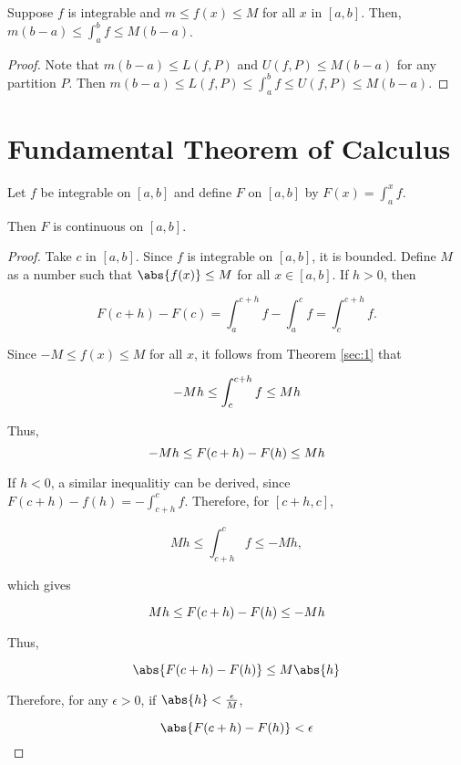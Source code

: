 \documentclass[11pt]{scrartcl}
\begin{document}
\begin{theorem}
  \label{sec:1}
  Suppose $f$ is integrable and $m\leq f(x) \leq M$ for all $x$ in $[a, b]$.
  Then, $m(b-a)\leq \int_a^b f \leq M(b-a)$.
\end{theorem}

\begin{proof}
  Note that $m(b-a) \leq L(f, P)$ and $U(f, P) \leq M(b-a)$ for any
  partition $P$. Then
  $m(b-a) \leq L(f, P) \leq \int_a^b f \leq U(f, P) \leq M(b-a)$.
\end{proof}
\section{Fundamental Theorem of Calculus}
\begin{theorem}
  Let $f$ be integrable on $[a, b]$ and define $F$ on $[a, b]$ by
  $F(x) = \int_a^xf $.

  Then $F$ is continuous on $[a, b]$.
\end{theorem}

\begin{proof}
  Take $c$ in $[a, b]$. Since $f$ is integrable on $[a, b]$, it is
  bounded. Define $M$ as a number such that $\abs{f(x)} \leq M$ for
  all $x\in[a, b]$. If $h > 0$, then

  \begin{equation*}
    F(c+h) - F(c) = \int_{a}^{c+h}f - \int_{a}^{c}f = \int_{c}^{c+h} f.
  \end{equation*}

  Since $-M \leq f(x) \leq M $ for all $x$, it follows from Theorem \ref{sec:1} that

  \begin{equation*}
    -M\* h \leq \int_c^{c+h} f \leq M\*h
  \end{equation*}

  Thus,
  \begin{equation*}
    -M\* h \leq F(c+h) - F(h) \leq M\*h
  \end{equation*}

  If $h < 0$, a similar inequalitiy can be derived, since
  $F(c+h) - f(h) = - \int^c_{c+h}f$. Therefore, for $[c+h, c]$,

  \begin{equation*}
    Mh \leq \int_{c+h}^cf \leq - Mh,
  \end{equation*}

  which gives


  \begin{equation*}
    M\* h \leq F(c+h) - F(h) \leq -M\*h
  \end{equation*}

  Thus,


  \begin{equation*}
    \abs{F(c+h) - F(h)} \leq M\abs{h}
  \end{equation*}

  Therefore, for any $\epsilon>0$, if $\abs{h} < \frac{\epsilon}{M}$,

  \begin{equation*}
    \abs{F(c+h) - F(h)} < \epsilon
  \end{equation*}
\end{proof}
\end{document}
